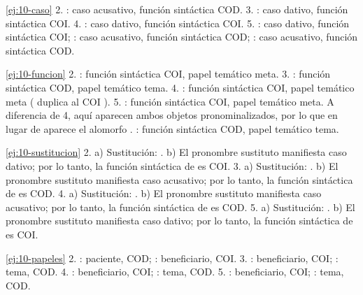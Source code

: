 \lecturasrecomendadas

\solucionario

\begin{solucion}{\ref{ej:10-caso}}
2. : caso acusativo, función sintáctica COD. 3. : caso
dativo, función sintáctica COI. 4. : caso dativo, función sintáctica
COI. 5. : caso dativo, función sintáctica COI; : caso
acusativo, función sintáctica COD; : caso acusativo, función
sintáctica COD.
\end{solucion}

\begin{solucion}{\ref{ej:10-funcion}}
2. : función sintáctica COI, papel temático meta. 3. :
función sintáctica COD, papel temático tema. 4. : función sintáctica
COI, papel temático meta ( duplica al COI ). 5.
: función sintáctica COI, papel temático meta. A diferencia de 4, aquí
aparecen ambos objetos pronominalizados, por lo que en lugar de 
aparece el alomorfo . : función sintáctica COD, papel
temático tema.
\end{solucion}

\begin{solucion}{\ref{ej:10-sustitucion}}
2. a) Sustitución: . b) El pronombre
sustituto  manifiesta caso dativo; por lo tanto, la función sintáctica
de  es COI. 3. a) Sustitución: . b) El
pronombre sustituto  manifiesta caso acusativo; por lo tanto, la
función sintáctica de  es COD. 4. a) Sustitución: . b) El pronombre sustituto  manifiesta caso acusativo;
por lo tanto, la función sintáctica de  es COD. 5. a) Sustitución:
. b) El pronombre sustituto 
manifiesta caso dativo; por lo tanto, la función sintáctica de  es
COI.
\end{solucion}

\begin{solucion}{\ref{ej:10-papeles}}
2. : paciente, COD; : beneficiario, COI. 3. :
beneficiario, COI; : tema, COD. 4. : beneficiario, COI;
: tema, COD. 5. : beneficiario, COI; : tema,
COD.
\end{solucion}

